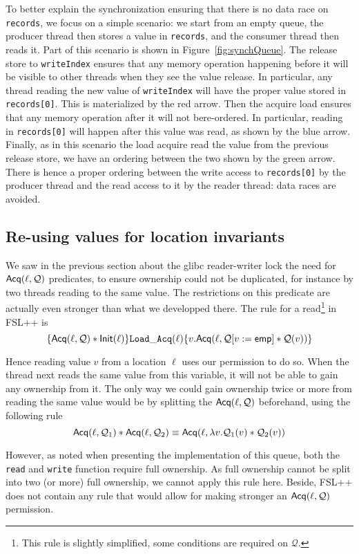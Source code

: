 To better explain the synchronization ensuring that there is no data race on \texttt{records}, we focus on a simple scenario: we start from an empty queue, the producer thread then stores a value in \texttt{records}, and the consumer thread then reads it. Part of this scenario is shown in Figure~\ref{fig:synchQueue}. The release store to \texttt{writeIndex} ensures that any memory operation happening before it will be visible to other threads when they see the value release. In particular, any thread reading the new value of \texttt{writeIndex} will have the proper value stored in \texttt{records[0]}. This is materialized by the red arrow. Then the acquire load ensures that any memory operation after it will not bere-ordered. In particular, reading in \texttt{records[0]} will happen after this value was read, as shown by the blue arrow. Finally, as in this scenario the load acquire read the value from the previous release store, we have an ordering between the two shown by the green arrow. There is hence a proper ordering between the write access to \texttt{records[0]} by the producer thread and the read access to it by the reader thread: data races are avoided.

\subsection{Re-using values for location invariants}
We saw in the previous section about the glibc reader-writer lock the need for $\operatorname{\mathsf{Acq}}(\ell, \mathcal{Q})$ predicates, to ensure ownership could not be duplicated, for instance by two threads reading to the same value. The restrictions on this predicate are actually even stronger than what we developped there. The rule for a read\footnote{This rule is slightly simplified, some conditions are required on $\mathcal{Q}$.} in FSL++ is 
\[
		\{\operatorname{\mathsf{Acq}}(\ell, \mathcal{Q}) * \mathsf{Init(\ell)}\} \mathtt{Load\_Acq}(\ell) \{v.\mathsf{Acq}(\ell, \mathcal{Q}[v:=\mathsf{emp}] * \mathcal{Q}(v))\}
\]

Hence reading value $v$ from a location $\ell$ uses our permission to do so. When the thread next reads the same value from this variable, it will not be able to gain any ownership from it. The only way we could gain ownership twice or more from reading the same value would be by splitting the $\operatorname{\mathsf{Acq}}(\ell, \mathcal{Q})$ beforehand, using the following rule
\[
		\operatorname{\mathsf{Acq}}(\ell, \mathcal{Q}_{1}) * \operatorname{\mathsf{Acq}}(\ell, \mathcal{Q}_{2}) \equiv \mathsf{Acq}(\ell, \lambda v. \mathcal{Q}_1(v) * \mathcal{Q}_2(v))
\]

However, as noted when presenting the implementation of this queue, both the \texttt{read} and \texttt{write} function require full ownership. As full ownership cannot be split into two (or more) full ownership, we cannot apply this rule here. Beside, FSL++ does not contain any rule that would allow for making stronger an $\operatorname{\mathsf{Acq}}(\ell, \mathcal{Q})$ permission. 

